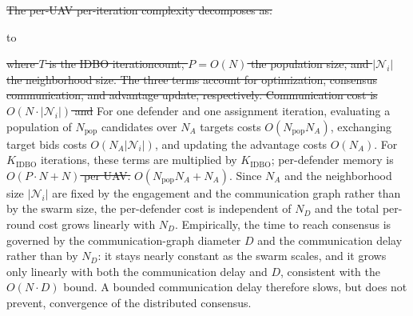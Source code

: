 \documentclass[lettersize,journal]{IEEEtran}
\providecommand{\DIFadd}[1]{{\protect\color{blue}#1}} %
\providecommand{\DIFdel}[1]{{\protect\color{red}\sout{#1}}}                      %
\newcommand{\DIFdelDISPLAY}[1]{%
  \par\addvspace{4pt}%
  \sbox{\DIFDELbox}{$\displaystyle\color{red}\begin{aligned}#1\end{aligned}$}%
  \noindent\hbox to\hsize{\hfil %
    \rlap{\usebox{\DIFDELbox}}%
    \raisebox{\dimexpr(\ht\DIFDELbox-\dp\DIFDELbox)/2\relax}[0pt][0pt]{\textcolor{red}{\rule{\wd\DIFDELbox}{0.6pt}}}%
    \hfil}%
  \par\addvspace{4pt}%
} %
\providecommand{\DIFaddbegin}{} %
\providecommand{\DIFaddend}{} %
\providecommand{\DIFdelbegin}{} %
\providecommand{\DIFdelend}{} %
\newcommand{\DIFscaledelfig}{0.5}
\newlength{\DIFdelgraphicswidth} %
\newlength{\DIFdelgraphicsheight} %
\newcommand{\DIFaddincludegraphics}[2][]{{\color{blue}\fbox{\DIFOincludegraphics[#1]{#2}}}} %
\newcommand{\DIFdelincludegraphics}[2][]{%
\sbox{\DIFdelgraphicsbox}{\DIFOincludegraphics[#1]{#2}}%
\settoboxwidth{\DIFdelgraphicswidth}{\DIFdelgraphicsbox} %
\settoboxtotalheight{\DIFdelgraphicsheight}{\DIFdelgraphicsbox} %
\scalebox{\DIFscaledelfig}{%
\parbox[b]{\DIFdelgraphicswidth}{\usebox{\DIFdelgraphicsbox}\\[-\baselineskip] \rule{\DIFdelgraphicswidth}{0em}}\llap{\resizebox{\DIFdelgraphicswidth}{\DIFdelgraphicsheight}{%
\setlength{\unitlength}{\DIFdelgraphicswidth}%
\begin{picture}(1,1)%
\thicklines\linethickness{2pt} %
{\color[rgb]{1,0,0}\put(0,0){\framebox(1,1){}}}%
{\color[rgb]{1,0,0}\put(0,0){\line( 1,1){1}}}%
{\color[rgb]{1,0,0}\put(0,1){\line(1,-1){1}}}%
\end{picture}%
}\hspace*{3pt}}} %
} %
\DeclareRobustCommand{\DIFaddbegin}{\DIFOaddbegin \let\includegraphics\DIFaddincludegraphics} %
\DeclareRobustCommand{\DIFaddend}{\DIFOaddend \let\includegraphics\DIFOincludegraphics} %
\DeclareRobustCommand{\DIFdelbegin}{\DIFOdelbegin \let\includegraphics\DIFdelincludegraphics} %
\DeclareRobustCommand{\DIFdelend}{\DIFOaddend \let\includegraphics\DIFOincludegraphics} %
\begin{document}
\DIFdelbegin \DIFdel{The per-UAV per-iteration complexity decomposes as:
}%

\DIFdelDISPLAY{%
C_{\text{total}} = O(T \cdot P \cdot N^2) + O(N \cdot |\mathcal{N}_i|) + O(N)
}
\DIFdel{where $T$ is the IDBO iterationcount, $P = O(N)$ the population size, and $|\mathcal{N}_i|$ the neighborhood size. The three terms account for optimization, consensus communication, and
        advantage update, respectively. Communication cost is $O(N \cdot |\mathcal{N}_i|)$ and }\DIFdelend \DIFaddbegin \DIFadd{For one defender and one assignment iteration, evaluating a population of $N_{\mathrm{pop}}$
candidates over $N_A$ targets costs $O(N_{\mathrm{pop}}N_A)$, exchanging target bids costs
$O(N_A|\mathcal N_i|)$, and updating the advantage costs $O(N_A)$. For $K_{\mathrm{IDBO}}$
iterations, these terms are multiplied by $K_{\mathrm{IDBO}}$; per-defender }\DIFaddend memory is
\DIFdelbegin \DIFdel{$O(P \cdot N + N)$ per UAV.
}\DIFdelend \DIFaddbegin \DIFadd{$O(N_{\mathrm{pop}}N_A+N_A)$.
Since $N_A$ and the neighborhood size $|\mathcal N_i|$ are fixed by the engagement and the
communication graph rather than by the swarm size, the per-defender cost is independent of
$N_D$ and the total per-round cost grows linearly with $N_D$. Empirically, the time to reach
consensus is governed by the communication-graph diameter $D$ and the communication delay
rather than by $N_D$: it stays nearly constant as the swarm scales, and it grows only linearly
with both the communication delay and $D$, consistent with the $O(N\cdot D)$ bound. A bounded
communication delay therefore slows, but does not prevent, convergence of the distributed
consensus.
}
\end{document}
